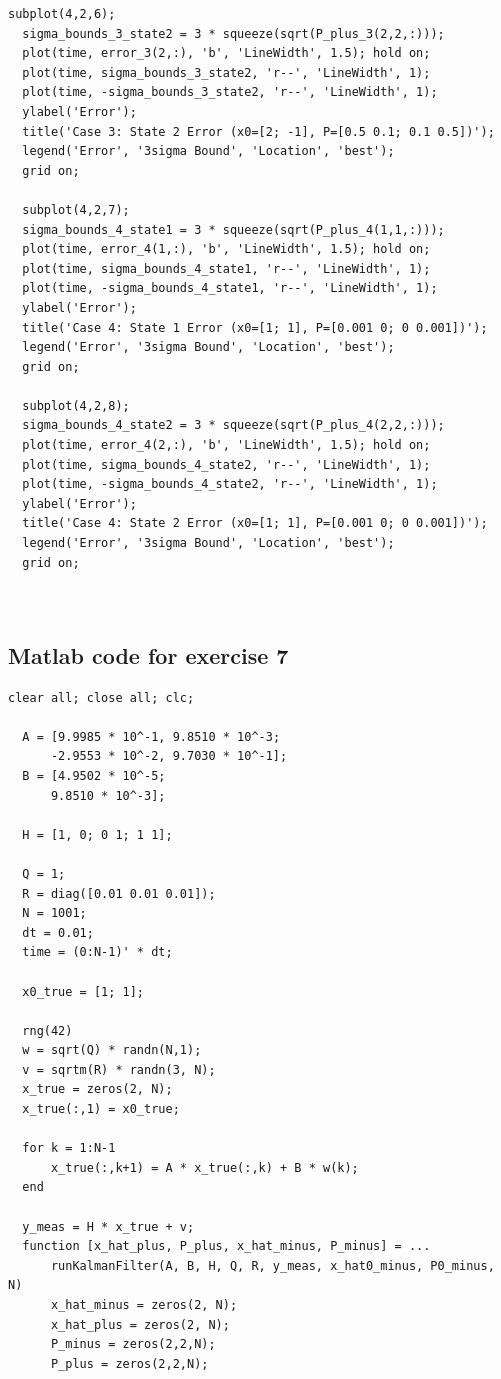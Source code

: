 \documentclass[12pt,A4, onecolumn]{exam}
\begin{document}
\begin{questions}
\begin{lstlisting}[style=matlabstyle]
  subplot(4,2,6);
  sigma_bounds_3_state2 = 3 * squeeze(sqrt(P_plus_3(2,2,:)));
  plot(time, error_3(2,:), 'b', 'LineWidth', 1.5); hold on;
  plot(time, sigma_bounds_3_state2, 'r--', 'LineWidth', 1);
  plot(time, -sigma_bounds_3_state2, 'r--', 'LineWidth', 1);
  ylabel('Error');
  title('Case 3: State 2 Error (x0=[2; -1], P=[0.5 0.1; 0.1 0.5])');
  legend('Error', '3sigma Bound', 'Location', 'best');
  grid on;

  subplot(4,2,7);
  sigma_bounds_4_state1 = 3 * squeeze(sqrt(P_plus_4(1,1,:)));
  plot(time, error_4(1,:), 'b', 'LineWidth', 1.5); hold on;
  plot(time, sigma_bounds_4_state1, 'r--', 'LineWidth', 1);
  plot(time, -sigma_bounds_4_state1, 'r--', 'LineWidth', 1);
  ylabel('Error');
  title('Case 4: State 1 Error (x0=[1; 1], P=[0.001 0; 0 0.001])');
  legend('Error', '3sigma Bound', 'Location', 'best');
  grid on;

  subplot(4,2,8);
  sigma_bounds_4_state2 = 3 * squeeze(sqrt(P_plus_4(2,2,:)));
  plot(time, error_4(2,:), 'b', 'LineWidth', 1.5); hold on;
  plot(time, sigma_bounds_4_state2, 'r--', 'LineWidth', 1);
  plot(time, -sigma_bounds_4_state2, 'r--', 'LineWidth', 1);
  ylabel('Error');
  title('Case 4: State 2 Error (x0=[1; 1], P=[0.001 0; 0 0.001])');
  legend('Error', '3sigma Bound', 'Location', 'best');
  grid on;

  
\end{lstlisting}


\subsection{Matlab code for exercise 7}

\begin{lstlisting}[style=matlabstyle]
  clear all; close all; clc;

  A = [9.9985 * 10^-1, 9.8510 * 10^-3;
      -2.9553 * 10^-2, 9.7030 * 10^-1];
  B = [4.9502 * 10^-5;
      9.8510 * 10^-3];

  H = [1, 0; 0 1; 1 1];

  Q = 1;
  R = diag([0.01 0.01 0.01]);
  N = 1001;
  dt = 0.01;
  time = (0:N-1)' * dt;

  x0_true = [1; 1];

  rng(42)
  w = sqrt(Q) * randn(N,1);
  v = sqrtm(R) * randn(3, N);
  x_true = zeros(2, N);
  x_true(:,1) = x0_true;

  for k = 1:N-1
      x_true(:,k+1) = A * x_true(:,k) + B * w(k);
  end

  y_meas = H * x_true + v;
  function [x_hat_plus, P_plus, x_hat_minus, P_minus] = ...
      runKalmanFilter(A, B, H, Q, R, y_meas, x_hat0_minus, P0_minus, N)
      x_hat_minus = zeros(2, N);
      x_hat_plus = zeros(2, N);
      P_minus = zeros(2,2,N);
      P_plus = zeros(2,2,N);


\end{lstlisting}
\end{questions}
\end{document}
